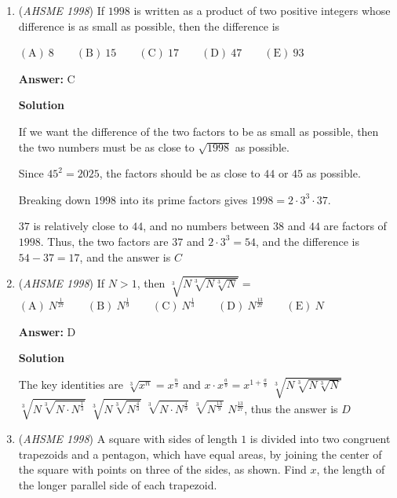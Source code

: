 \begin{enumerate}
 $2^3 - 2^2 - 2^1 + 1 = k$
$k = 3$, and the answer is $\boxed{C}$



	\item (\textit{AHSME 1998}) If $1998$ is written as a product of two positive integers whose difference is as small as possible, then the difference is 


 $\mathrm{(A) \ }8 \qquad \mathrm{(B) \ }15 \qquad \mathrm{(C) \ }17 \qquad \mathrm{(D) \ }47 \qquad \mathrm{(E) \ } 93$

 \textbf{Answer: }C



\textbf{Solution}

If we want the difference of the two factors to be as small as possible, then the two numbers must be as close to $\sqrt{1998}$ as possible.

 Since $45^2 = 2025$, the factors should be as close to $44$ or $45$ as possible.

 Breaking down $1998$ into its prime factors gives $1998 = 2\cdot 3^3 \cdot 37$.  

 $37$ is relatively close to $44$, and no numbers between $38$ and $44$ are factors of $1998$.  Thus, the two factors are $37$ and $2\cdot 3^3 = 54$, and the difference is $54 - 37 = 17$, and the answer is $\boxed{C}$



	\item (\textit{AHSME 1998}) If $N > 1$, then $\sqrt[3]{N\sqrt[3]{N\sqrt[3]{N}}} =$
$\mathrm{(A) \ } N^{\frac 1{27}} \qquad \mathrm{(B) \ } N^{\frac 1{9}} \qquad \mathrm{(C) \ } N^{\frac 1{3}} \qquad \mathrm{(D) \ } N^{\frac {13}{27}} \qquad \mathrm{(E) \ } N$

 \textbf{Answer: }D



\textbf{Solution}

The key identities are $\sqrt[3]{x^n} = x^{\frac{n}{3}}$ and $x \cdot x^{\frac{a}{b}} = x^{1 + \frac{a}{b}}$
$\sqrt[3]{N\sqrt[3]{N\sqrt[3]{N}}}$
$\sqrt[3]{N\sqrt[3]{N\cdot N^{\frac{1}{3}}}}$
$\sqrt[3]{N\sqrt[3]{N^{\frac{4}{3}}}}$
$\sqrt[3]{N\cdot{N^{\frac{4}{9}}}}$
$\sqrt[3]{{N^{\frac{13}{9}}}}$
$N^{\frac{13}{27}}$, thus the answer is $\boxed{D}$



	\item (\textit{AHSME 1998}) A square with sides of length $1$ is divided into two congruent trapezoids and a pentagon, which have equal areas, by joining the center of the square with points on three of the sides, as shown. Find $x$, the length of the longer parallel side of each trapezoid. 



\end{enumerate}
